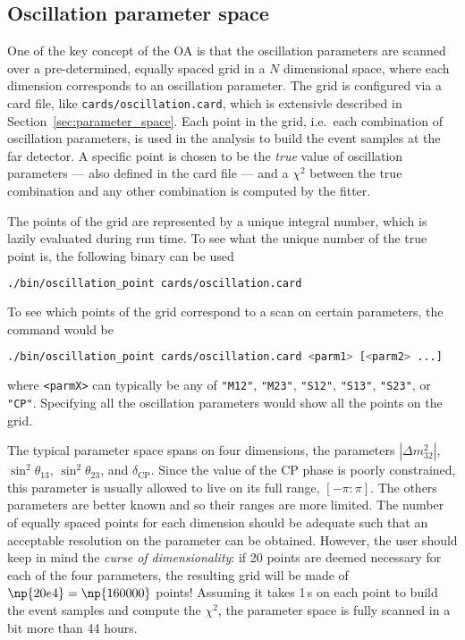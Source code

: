 \documentclass[a4paper, 11pt]{article}
\newcommand{\refsec}[1]{Section~\ref{#1}}
\begin{document}
\subsection{Oscillation parameter space}

One of the key concept of the OA is that the oscillation parameters are scanned over %
a pre-determined, equally spaced grid in a $N$ dimensional space, %
where each dimension corresponds to an oscillation parameter.
The grid is configured via a card file, like \texttt{cards/oscillation.card}, which %
is extensivle described in \refsec{sec:parameter_space}.
Each point in the grid, i.e.\ each combination of oscillation parameters, is used in %
the analysis to build the event samples at the far detector.
A specific point is chosen to be the \emph{true} value of oscillation parameters %
--- also defined in the card file --- and a $\chi^2$ between the true combination %
and any other combination is computed by the fitter.

The points of the grid are represented by a unique integral number, %
which is lazily evaluated during run time.
To see what the unique number of the true point is, the following binary can be used
\begin{lstlisting}[language=bash]
	./bin/oscillation_point cards/oscillation.card
\end{lstlisting}
To see which points of the grid correspond to a scan on certain parameters, 
the command would be
\begin{lstlisting}[language=bash]
	./bin/oscillation_point cards/oscillation.card <parm1> [<parm2> ...]
\end{lstlisting}
where \texttt{<parmX>} can typically be any of \texttt{"M12"}, \texttt{"M23"}, \texttt{"S12"}, \texttt{"S13"}, \texttt{"S23"}, or \texttt{"CP"}.
Specifying all the oscillation parameters would show all the points on the grid.

The typical parameter space spans on four dimensions, the parameters %
$|\Delta m^2_{32}|$, $\sin^2 \theta_{13}$, $\sin^2 \theta_{23}$, and $\delta_\text{CP}$.
Since the value of the CP phase is poorly constrained, this parameter is usually %
allowed to live on its full range, $[-\pi:\pi]$.
The others parameters are better known and so their ranges are more limited.
The number of equally spaced points for each dimension should be adequate such that %
an acceptable resolution on the parameter can be obtained.
However, the user should keep in mind the \emph{curse of dimensionality}: %
if 20 points are deemed necessary for each of the four parameters, the resulting %
grid will be made of $\np{20e4} = \np{160000}$ points!
Assuming it takes 1\,s on each point to build the event samples and compute the $\chi^2$, %
the parameter space is fully scanned in a bit more than 44 hours.
\end{document}
